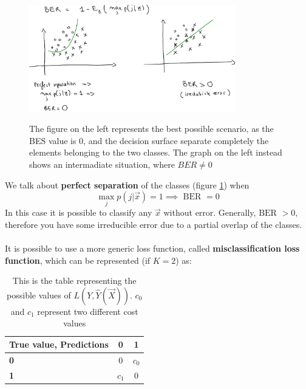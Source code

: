 \begin{figure}[ht]
\caption{The figure on the left represents the best possible scenario, as the BES value is 0, and the decision surface separate completely the elements belonging to the two classes. The graph on the left instead shows an intermadiate situation, where $ BER \neq 0 $}
\centering
\includegraphics[width=0.8\textwidth]{BERBayesErrorRate}
\label{BER}
\end{figure}

    We talk about \textbf{perfect separation} of the classes (figure \ref{BER}) when 
    $$\max_{j} p(j|\vec{x}) = 1 \implies \text{ BER } = 0$$ In this case it is
    possible to classify any $\vec{x}$ without error. Generally, \textbf{$\text{BER } > 0$}, therefore you have some irreducible error
    due to a partial overlap of the classes.
\\\\
    It is possible to use a more generic loss function, called
    \textbf{misclassification loss function}, which can be represented (if $K =
    2$) as:
    
\begin{table}[H]
\centering
\caption{This is the table representing the possible values of $ L(Y,
\hat{Y}(\vec{X})) $. $c_0$ and $c_1$ represent two different cost values}
\begin{tabular}{|l||c|c|}
	\hline
	\textbf{True value, Predictions} & \textbf{0} & \textbf{1} \\
	\hline
	\hline
	\textbf{0} &  $0$ & $c_0$ \\
	\hline
	\textbf{\textbf{1}} & $c_1$ & $0$\\
	\hline
\end{tabular}
\end{table} 


